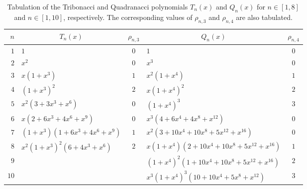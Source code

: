 \documentclass[review]{elsarticle}
\theoremstyle{plain}
\begin{document}
\newpage
\begin{table}[!htb]
\centering
{\begin{tabular}{|r|l|c|l|c|}
  \hline
  $n$ & \multicolumn{1}{c|}{$T_n(x)$} & $\rho_{n,3}$ & \multicolumn{1}{c|}{$Q_n(x)$} & $\rho_{n,4}$ \\ \hline
  $1$ & $1$ & $0$ & $1$ & $0$ \\
  $2$ & $x^2$ & $0$ & $x^3$ & $0$ \\
  $3$ & $x(1+x^3)$ & $1$ & $x^2(1+x^4)$ & $1$ \\
  $4$ & $(1+x^3)^2$ & $2$ & $x(1+x^4)^2$ & $2$ \\
  $5$ & $x^2(3 +3x^3 +x^6)$ & $0$ & $(1+x^4)^3$ & $3$ \\
  $6$ & $x(2 +6x^3 +4x^6 +x^9)$ & $0$ & $x^3(4 +6x^4 +4x^8 +x^{12})$ & $0$ \\
  $7$ & $(1+x^3)(1 + 6x^3 +4x^6 +x^9)$ & $1$ & $x^2(3 +10x^4 +10x^8 +5x^{12} +x^{16})$ & $0$ \\
  $8$ & $x^2 (1+x^3)^2 (6 +4x^3 +x^6)$ & $2$ & $x (1 + x^4) (2 + 10 x^4 + 10 x^8 + 5 x^{12} + x^{16})$ & $1$ \\
  $9$ & && $(1 + x^4)^2 (1 + 10 x^4 + 10 x^8 + 5 x^{12} + x^{16})$ & $2$ \\
  $10$ & && $x^3 (1 + x^4)^3 (10 + 10 x^4 + 5 x^8 + x^{12})$ & $3$ \\ \hline
\end{tabular}}
\caption{\label{tb:Tri_Quad_poly}
  Tabulation of the Tribonacci and Quadranacci polynomials $T_n(x)$ and $Q_n(x)$ for
  $n\in[1,8]$ and $n\in[1,10]$, respectively.
  The corresponding values of $\rho_{n,3}$ and $\rho_{n,4}$ are also tabulated.}
\end{table}
\end{document}
